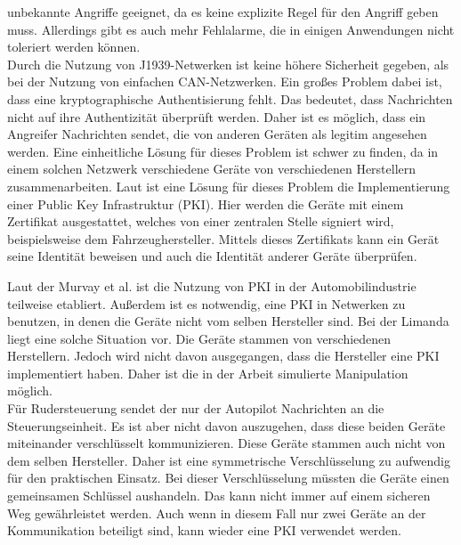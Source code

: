 unbekannte Angriffe geeignet, da es keine explizite Regel für den Angriff geben muss. Allerdings gibt es auch mehr Fehlalarme,
die in einigen Anwendungen nicht toleriert werden können. \\
Durch die Nutzung von J1939-Netwerken ist keine höhere Sicherheit gegeben, als bei der Nutzung von einfachen CAN-Netzwerken. 
Ein großes Problem dabei ist, dass
eine kryptographische Authentisierung fehlt. Das bedeutet, dass Nachrichten nicht auf ihre Authentizität überprüft werden.
Daher ist es möglich, dass ein Angreifer Nachrichten sendet, die von anderen Geräten als legitim angesehen werden.
Eine einheitliche Lösung für dieses Problem ist schwer zu finden, da in einem solchen Netzwerk verschiedene Geräte
von verschiedenen Herstellern zusammenarbeiten. Laut \cite{Murvay2018} ist eine Lösung für dieses Problem die Implementierung einer 
Public Key Infrastruktur (PKI).
Hier werden die Geräte mit einem Zertifikat ausgestattet, welches von einer zentralen Stelle signiert wird, beispielsweise
dem Fahrzeughersteller. Mittels dieses Zertifikats kann ein Gerät seine Identität beweisen und auch die Identität anderer Geräte
überprüfen. 

Laut der Murvay et al. \cite{Murvay2018} ist die Nutzung von PKI in der Automobilindustrie teilweise etabliert. 
Außerdem ist es notwendig, eine PKI in 
Netwerken zu benutzen, in denen die Geräte nicht vom selben Hersteller sind.
Bei der Limanda liegt eine solche Situation vor. Die Geräte stammen von verschiedenen Herstellern. Jedoch wird nicht
davon ausgegangen, dass die Hersteller eine PKI implementiert haben. Daher ist die in der Arbeit simulierte Manipulation
möglich. \\
Für Rudersteuerung sendet der nur der Autopilot Nachrichten an die Steuerungseinheit. Es ist aber nicht davon auszugehen,
dass diese beiden Geräte miteinander verschlüsselt kommunizieren. Diese Geräte stammen auch nicht von dem selben Hersteller.
Daher ist eine symmetrische Verschlüsselung zu aufwendig für den praktischen Einsatz. Bei dieser Verschlüsselung müssten
die Geräte einen gemeinsamen Schlüssel aushandeln. Das kann nicht immer auf einem sicheren Weg gewährleistet werden.
Auch wenn in diesem Fall nur zwei Geräte an der Kommunikation beteiligt sind, kann wieder eine PKI verwendet werden.

